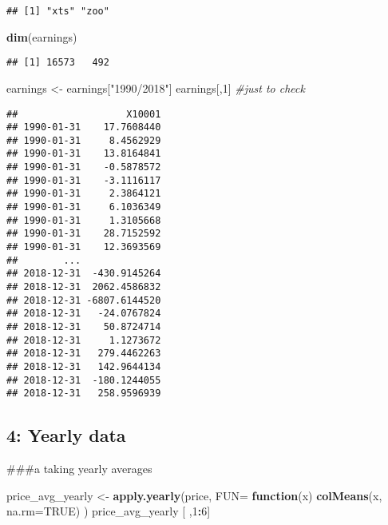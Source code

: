 \documentclass[
]{article}
\newenvironment{Shaded}{\begin{snugshade}}{\end{snugshade}}
\newcommand{\AttributeTok}[1]{\textcolor[rgb]{0.13,0.29,0.53}{#1}}
\newcommand{\CommentTok}[1]{\textcolor[rgb]{0.56,0.35,0.01}{\textit{#1}}}
\newcommand{\ConstantTok}[1]{\textcolor[rgb]{0.56,0.35,0.01}{#1}}
\newcommand{\ControlFlowTok}[1]{\textcolor[rgb]{0.13,0.29,0.53}{\textbf{#1}}}
\newcommand{\DecValTok}[1]{\textcolor[rgb]{0.00,0.00,0.81}{#1}}
\newcommand{\FunctionTok}[1]{\textcolor[rgb]{0.13,0.29,0.53}{\textbf{#1}}}
\newcommand{\NormalTok}[1]{#1}
\newcommand{\OtherTok}[1]{\textcolor[rgb]{0.56,0.35,0.01}{#1}}
\newcommand{\SpecialCharTok}[1]{\textcolor[rgb]{0.81,0.36,0.00}{\textbf{#1}}}
\newcommand{\StringTok}[1]{\textcolor[rgb]{0.31,0.60,0.02}{#1}}
\begin{document}
\begin{verbatim}
## [1] "xts" "zoo"
\end{verbatim}

\begin{Shaded}
\begin{Highlighting}[]
\FunctionTok{dim}\NormalTok{(earnings)}
\end{Highlighting}
\end{Shaded}

\begin{verbatim}
## [1] 16573   492
\end{verbatim}

\begin{Shaded}
\begin{Highlighting}[]
\NormalTok{earnings }\OtherTok{\textless{}{-}}\NormalTok{ earnings[}\StringTok{"1990/2018"}\NormalTok{]}
\NormalTok{earnings[,}\DecValTok{1}\NormalTok{] }\CommentTok{\#just to check}
\end{Highlighting}
\end{Shaded}

\begin{verbatim}
##                   X10001
## 1990-01-31    17.7608440
## 1990-01-31     8.4562929
## 1990-01-31    13.8164841
## 1990-01-31    -0.5878572
## 1990-01-31    -3.1116117
## 1990-01-31     2.3864121
## 1990-01-31     6.1036349
## 1990-01-31     1.3105668
## 1990-01-31    28.7152592
## 1990-01-31    12.3693569
##        ...              
## 2018-12-31  -430.9145264
## 2018-12-31  2062.4586832
## 2018-12-31 -6807.6144520
## 2018-12-31   -24.0767824
## 2018-12-31    50.8724714
## 2018-12-31     1.1273672
## 2018-12-31   279.4462263
## 2018-12-31   142.9644134
## 2018-12-31  -180.1244055
## 2018-12-31   258.9596939
\end{verbatim}

\subsection{4: Yearly data}\label{yearly-data}

\#\#\#a taking yearly averages

\begin{Shaded}
\begin{Highlighting}[]
\NormalTok{price\_avg\_yearly }\OtherTok{\textless{}{-}} \FunctionTok{apply.yearly}\NormalTok{(price, }\AttributeTok{FUN=} \ControlFlowTok{function}\NormalTok{(x) }\FunctionTok{colMeans}\NormalTok{(x, }\AttributeTok{na.rm=}\ConstantTok{TRUE}\NormalTok{) )}
\NormalTok{price\_avg\_yearly [ ,}\DecValTok{1}\SpecialCharTok{:}\DecValTok{6}\NormalTok{]}
\end{Highlighting}
\end{Shaded}
\end{document}
